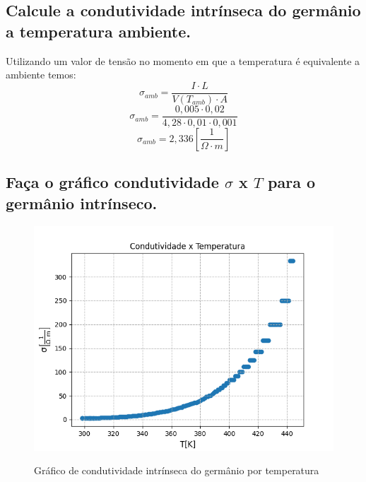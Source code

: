 \subsection{Calcule a condutividade intrínseca do germânio a temperatura ambiente.}
Utilizando um valor de tensão no momento em que a temperatura é equivalente a ambiente temos:
\begin{equation} \sigma_{amb} =\frac{I \cdot L}{V(T_{amb})\cdot A} \label{eq5}\end{equation}
\begin{equation} \sigma_{amb} =\frac{0,005 \cdot 0,02}{4,28\cdot 0,01\cdot 0,001} \label{eq6}\end{equation}
\begin{equation} \sigma_{amb} =2,336\left[\frac{1}{\Omega\cdot m}\right] \label{eq7}\end{equation}

\subsection{Faça o gráfico condutividade \texorpdfstring{$\sigma$ x $T$}{} para o germânio intrínseco.}
    \begin{figure}[H]
        \centering    
        \includegraphics[width = \textwidth]{Figure_1.png}\label{fig1}
        \caption{Gráfico de condutividade intrínseca do germânio por temperatura}
    \end{figure}


